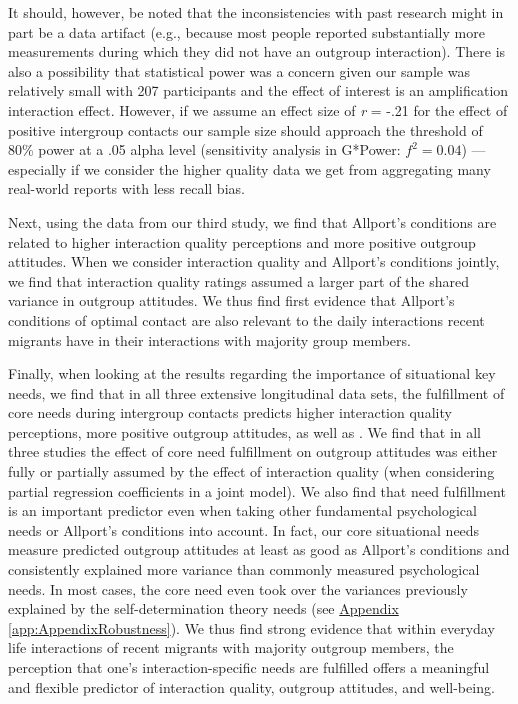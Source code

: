 \documentclass[man, 12pt, a4paper, mask]{apa7}
\theoremstyle{break}
\theoremstyle{plain}
\newcommand{\appref}[2][]{\hyperref[#2]{Appendix \ref*{#2}#1}}
\providecommand{\DIFaddtex}[1]{{\protect\color{blue}\uwave{#1}}} %
\providecommand{\DIFaddbegin}{} %
\providecommand{\DIFaddend}{} %
\providecommand{\DIFdelbegin}{} %
\providecommand{\DIFdelend}{} %
\providecommand{\DIFadd}[1]{\texorpdfstring{\DIFaddtex{#1}}{#1}} %
\newcommand{\DIFscaledelfig}{0.5}
\newlength{\DIFdelgraphicswidth} %
\newlength{\DIFdelgraphicsheight} %
\newcommand{\DIFaddincludegraphics}[2][]{{\color{blue}\fbox{\DIFOincludegraphics[#1]{#2}}}} %
\newcommand{\DIFdelincludegraphics}[2][]{%
\sbox{\DIFdelgraphicsbox}{\DIFOincludegraphics[#1]{#2}}%
\settoboxwidth{\DIFdelgraphicswidth}{\DIFdelgraphicsbox} %
\settoboxtotalheight{\DIFdelgraphicsheight}{\DIFdelgraphicsbox} %
\scalebox{\DIFscaledelfig}{%
\parbox[b]{\DIFdelgraphicswidth}{\usebox{\DIFdelgraphicsbox}\\[-\baselineskip] \rule{\DIFdelgraphicswidth}{0em}}\llap{\resizebox{\DIFdelgraphicswidth}{\DIFdelgraphicsheight}{%
\setlength{\unitlength}{\DIFdelgraphicswidth}%
\begin{picture}(1,1)%
\thicklines\linethickness{2pt} %
{\color[rgb]{1,0,0}\put(0,0){\framebox(1,1){}}}%
{\color[rgb]{1,0,0}\put(0,0){\line( 1,1){1}}}%
{\color[rgb]{1,0,0}\put(0,1){\line(1,-1){1}}}%
\end{picture}%
}\hspace*{3pt}}} %
} %
\DeclareRobustCommand{\DIFaddbegin}{\DIFOaddbegin \let\includegraphics\DIFaddincludegraphics} %
\DeclareRobustCommand{\DIFaddend}{\DIFOaddend \let\includegraphics\DIFOincludegraphics} %
\DeclareRobustCommand{\DIFdelbegin}{\DIFOdelbegin \let\includegraphics\DIFdelincludegraphics} %
\DeclareRobustCommand{\DIFdelend}{\DIFOaddend \let\includegraphics\DIFOincludegraphics} %
\begin{document}
It should, however, be noted that the inconsistencies with past research might in part be a data artifact (e.g., because most people reported substantially more measurements during which they did not have an outgroup interaction). There is also a possibility that statistical power was a concern given our sample was relatively small with 207 participants and the effect of interest is an amplification interaction effect. However, if we assume an effect size of \textit{r} = -.21 for the effect of positive intergroup contacts \citep[see][]{Pettigrew2006} our sample size should approach the threshold of 80\% power at a .05 alpha level (sensitivity analysis in G*Power: $f^2 = 0.04$) --- especially if we consider the higher quality data we get from aggregating many real-world reports with less recall bias. 

Next, using the data from our third study, we find that Allport's conditions are related to higher interaction quality perceptions and more positive outgroup attitudes. When we consider interaction quality and Allport's conditions jointly, we find that interaction quality ratings assumed a larger part of the shared variance in outgroup attitudes. We thus find first evidence that Allport's conditions of optimal contact are also relevant to the daily interactions recent migrants have in their interactions with majority group members. 

Finally, when looking at the results regarding the importance of situational key needs, we find that in all three extensive longitudinal data sets, the fulfillment of core needs during intergroup contacts predicts higher interaction quality perceptions, more positive outgroup attitudes, as well as \DIFdelbegin %
\DIFdelend \DIFaddbegin \DIFadd{higher well-being}\DIFaddend . We find that in all three studies the effect of core need fulfillment on outgroup attitudes was either fully or partially assumed by the effect of interaction quality (when considering partial regression coefficients in a joint model). We also find that need fulfillment is an important predictor even when taking other fundamental psychological needs or Allport's conditions into account. In fact, our core situational needs measure predicted outgroup attitudes at least as good as Allport's conditions and consistently explained more variance than commonly measured psychological needs. In most cases, the core need even took over the variances previously explained by the self-determination theory needs (see \appref{app:AppendixRobustness}). We thus find strong evidence that within everyday life interactions of recent migrants with majority outgroup members, the perception that one's interaction-specific needs are fulfilled offers a meaningful and flexible predictor of interaction quality, outgroup attitudes, and well-being.
\end{document}
